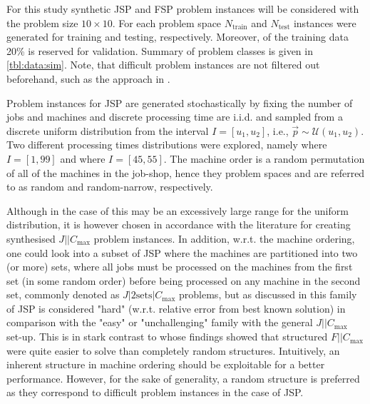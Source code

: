 \documentclass[smallextended]{svjour3}
\begin{document}
For this study synthetic JSP and FSP problem instances will be considered with 
the problem size $10\times10$. 
For each problem space $N_{\text{train}}$  and $N_{\text{test}}$ instances were 
generated for training and testing, respectively. Moreover, of the training 
data 20\% is reserved for validation.
Summary of problem classes is given in \cref{tbl:data:sim}.  
Note, that difficult problem instances are not filtered out beforehand, such as 
the approach in \citet{Whitley}. 


Problem instances for JSP are generated stochastically by fixing the number of 
jobs and machines and discrete processing time are i.i.d. and sampled from a 
discrete uniform distribution from the interval $I=[u_1,u_2]$, i.e., 
$\vec{p}\sim \mathcal{U}(u_1,u_2)$. 
Two different processing times distributions were explored, namely   
where $I=[1,99]$ and   where $I=[45,55]$.
The machine order is a random permutation of all of the machines in the 
job-shop, hence they problem spaces    and   are 
referred to as random and random-narrow, respectively. 

Although in the case of   this may be an excessively large range for 
the uniform distribution, it is however chosen in accordance with the 
literature \citep{Demirkol98} for creating synthesised $J||C_{\max}$ problem 
instances. In addition, w.r.t. the machine ordering, one could look into a 
subset of JSP where the machines are partitioned into two (or more) sets, where 
all jobs must be processed on the machines from the first set (in some random 
order) before being processed on any machine in the second set, commonly 
denoted as $J|2\textrm{sets}|C_{\max}$ problems, but as discussed in 
\cite{orlib_swv} this family of JSP is considered "hard" (w.r.t. relative error 
from best known solution) in comparison with the "easy" or "unchallenging" 
family with the general $J||C_{\max}$ set-up. %
This is in stark contrast to \citet{Whitley} whose findings showed that 
structured $F||C_{\max}$ were quite easier to solve than completely random 
structures. 
Intuitively, an inherent structure in machine ordering should be exploitable 
for a better performance.  However, for the sake of generality, a random 
structure is preferred as they correspond to difficult problem instances in the 
case of JSP. 
\end{document}
